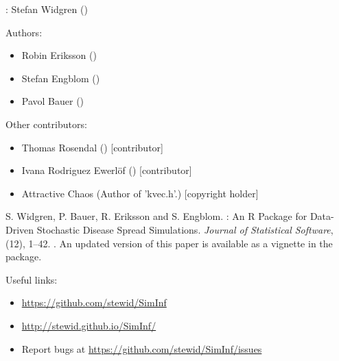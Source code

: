 \documentclass[letterpaper]{book}
\begin{document}
%
\begin{Author}
: Stefan Widgren  ()

Authors:
\begin{itemize}

\item{} Robin Eriksson ()
\item{} Stefan Engblom ()
\item{} Pavol Bauer ()

\end{itemize}


Other contributors:
\begin{itemize}

\item{} Thomas Rosendal () [contributor]
\item{} Ivana Rodriguez Ewerlöf () [contributor]
\item{} Attractive Chaos (Author of 'kvec.h'.) [copyright holder]

\end{itemize}


\end{Author}
%
\begin{References}
S. Widgren, P. Bauer, R. Eriksson and S. Engblom. : An \textsf{R} Package for Data-Driven Stochastic Disease Spread Simulations. \emph{Journal of Statistical Software}, (12), 1--42. . An updated version of this paper is available as a vignette in the package.
\end{References}
%
\begin{SeeAlso}
Useful links:
\begin{itemize}

\item{} \url{https://github.com/stewid/SimInf}
\item{} \url{http://stewid.github.io/SimInf/}
\item{} Report bugs at \url{https://github.com/stewid/SimInf/issues}

\end{itemize}


\end{SeeAlso}
\end{document}
